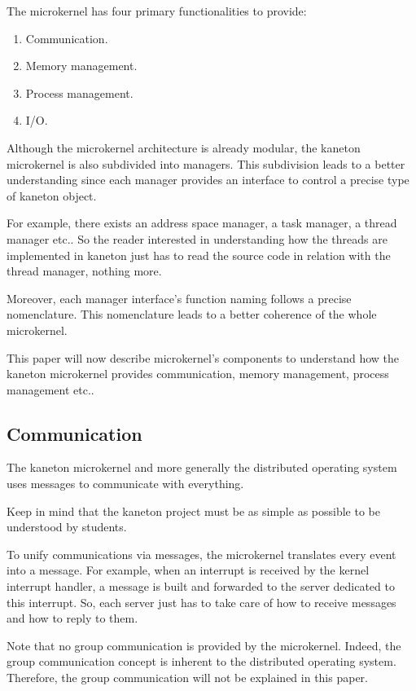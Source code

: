{\begin{multicols}{2}
The microkernel has four primary functionalities to provide:

\begin{enumerate}
  \item
    Communication.
  \item
    Memory management.
  \item
    Process management.
  \item
    I/O.
\end{enumerate}

Although the microkernel architecture is already modular, the kaneton
microkernel is also subdivided into managers. This subdivision leads to
a better understanding since each manager provides an interface to control
a precise type of kaneton object.

For example, there exists an address space manager, a task manager,
a thread manager etc.. So the reader interested in understanding how
the threads are implemented in kaneton just has to read the source code
in relation with the thread manager, nothing more.

Moreover, each manager interface's function naming follows a precise
nomenclature. This nomenclature leads to a better coherence of the whole
microkernel.

This paper will now describe microkernel's components to understand how
the kaneton microkernel provides communication, memory management, process
management etc..

%
%

\subsection{Communication}

The kaneton microkernel and more generally the distributed operating
system uses messages to communicate with everything.

Keep in mind that the kaneton project must be as simple as possible to be
understood by students.

To unify communications via messages, the microkernel translates every event
into a message. For example, when an interrupt is received by the kernel
interrupt handler, a message is built and forwarded to the server dedicated
to this interrupt. So, each server just has to take care of how to receive
messages and how to reply to them.

Note that no group communication is provided by the microkernel. Indeed, the
group communication concept is inherent to the distributed operating system.
Therefore, the group communication will not be explained in this paper.


\end{multicols}}
